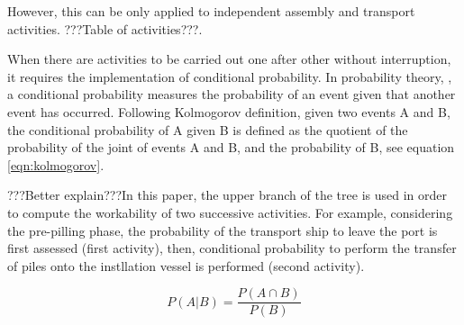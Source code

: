 However, this can be only applied to independent assembly and transport activities. ???Table of activities???. 

When there are activities to be carried out one after other without interruption, it requires the implementation of conditional probability. In probability theory, \cite{Thalemann2012}, a conditional probability measures the probability of an event given that another event has occurred. Following Kolmogorov definition, given two events A and B, the conditional probability of A given B is defined as the quotient of the probability of the joint of events A and B, and the probability of B, see equation \ref{eqn:kolmogorov}.

???Better explain???In this paper, the upper branch of the tree is used in order to compute the workability of two successive activities. For example, considering the pre-pilling phase, the probability of the transport ship to leave the port is first assessed (first activity), then, conditional probability to perform the transfer of piles onto the instllation vessel is performed (second activity).

\begin{equation}
\label{eqn:kolmogorov}
P \left(A \vert B \right) = \frac{P \left(A \cap B \right)}{P \left( B \right)}
\end{equation}


